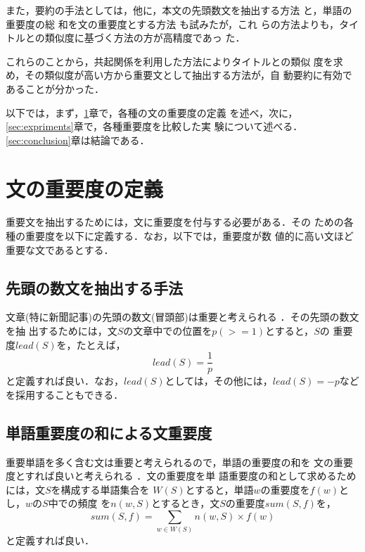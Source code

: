また，要約の手法としては，他に，本文の先頭数文を抽出する方法
\cite{brandow95:_autom_conden_elect_public}と，単語の重要度の総
和を文の重要度とする方法
\cite{zechner96:_fast_gener_abstr_gener_domain}も試みたが，これ
らの方法よりも，タイトルとの類似度に基づく方法の方が高精度であっ
た．

これらのことから，共起関係を利用した方法によりタイトルとの類似
度を求め，その類似度が高い方から重要文として抽出する方法が，自
動要約に有効であることが分かった．

以下では，まず，\ref{sec:measures}章で，各種の文の重要度の定義
を述べ，次に，\ref{sec:expriments}章で，各種重要度を比較した実
験について述べる．\ref{sec:conclusion}章は結論である．

\section{文の重要度の定義}
\label{sec:measures}

重要文を抽出するためには，文に重要度を付与する必要がある．その
ための各種の重要度を以下に定義する．なお，以下では，重要度が数
値的に高い文ほど重要な文であるとする．

\subsection{先頭の数文を抽出する手法}
\label{sec:lead}

文章(特に新聞記事)の先頭の数文(冒頭部)は重要と考えられる
\cite{brandow95:_autom_conden_elect_public}．その先頭の数文を抽
出するためには，文$S$の文章中での位置を$p(>=1)$とすると，$S$の
重要度$lead(S)$を，たとえば，
\begin{equation}
  \label{eq:lead}
  lead(S) = \frac{1}{p}
\end{equation}
と定義すれば良い．なお，$lead(S)$としては，その他には，$lead(S)
= -p $などを採用することもできる．

\subsection{単語重要度の和による文重要度}
\label{sec:sum}

重要単語を多く含む文は重要と考えられるので，単語の重要度の和を
文の重要度とすれば良いと考えられる
\cite{zechner96:_fast_gener_abstr_gener_domain}．文の重要度を単
語重要度の和として求めるためには，文$S$を構成する単語集合を
$W(S)$とすると，単語$w$の重要度を$f(w)$とし，$w$の$S$中での頻度
を$n(w,S)$とするとき，文$S$の重要度$sum(S,f)$を，
\begin{equation}
  \label{eq:sum}
  sum(S,f) = \sum_{w \in W(S)} n(w,S) \times f(w)
\end{equation}
と定義すれば良い．

